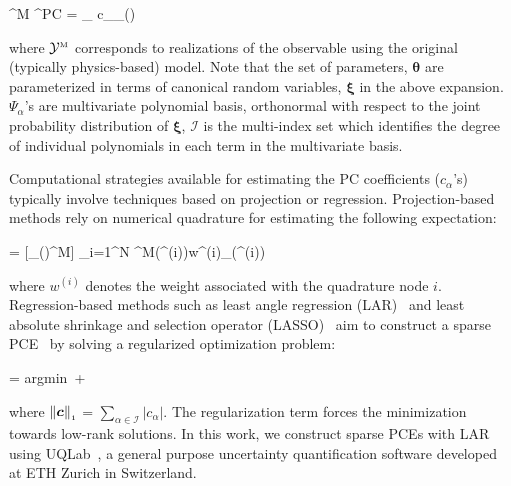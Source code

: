 \be
{}^{\mbox{\tiny M}} \approx {}^{\mbox{\tiny PC}} = 
\sum_{\alpha\in{}} c_{\alpha}\Psi_{\alpha}(\bm{\xi(\theta)}) 
\ee

\noindent where $\mathcal{Y}^{\mbox{\tiny M}}$ corresponds to realizations of the
observable using the original (typically physics-based) model. 
Note that the set of parameters, $\bm{\theta}$ are parameterized in terms of canonical random
variables, $\bm{\xi}$ in the above expansion. $\Psi_{\alpha}$'s are multivariate polynomial
basis, orthonormal with respect to the joint probability distribution of $\bm{\xi}$, $\mathcal{I}$
is the multi-index set which identifies the degree of individual polynomials in each term in the
multivariate basis.

Computational strategies available for estimating the PC coefficients ($c_\alpha$'s) typically involve
techniques based on projection or regression. Projection-based methods rely on numerical
quadrature for estimating the following expectation:

\be
{} = [\Psi_\alpha(\bm{\xi})\cdot{}^{\mbox{\tiny{M}}}]
\approx
\sum_{i=1}^{N} ^{\mbox{\tiny{M}}}(\bm{\theta}^{(i)})w^{(i)}\Psi_\alpha(\bm{\xi}^{(i)})
\ee

\noindent where $w^{(i)}$ denotes the weight associated with the quadrature node $i$. 
Regression-based methods such as least angle regression (LAR)~\cite{Efron:2004} and least absolute shrinkage
and selection operator (LASSO)~\cite{Tibshirani:1996} aim to construct a sparse PCE~\cite{Blatman:2008}
by solving a regularized optimization problem:

\be
{} = \mbox{argmin}~  + \lambda{}
\ee

\noindent where $\left\| {\bm{c}} \right\|_{\scriptscriptstyle 1}$ = $\sum_{\alpha\in \mathcal{I}} |c_\alpha |$.
The regularization term forces the minimization towards low-rank solutions.
In this work, we construct sparse PCEs with LAR using UQLab~\cite{Marelli:2014},
a general purpose uncertainty quantification software developed at ETH Zurich in Switzerland.


















